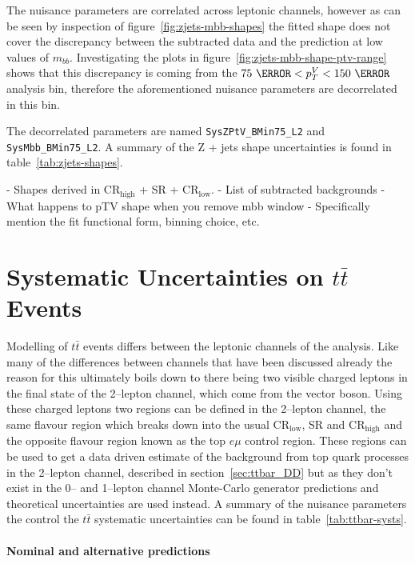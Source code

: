 The nuisance parameters are correlated across leptonic channels, however as can
be seen by inspection of figure~\ref{fig:zjets-mbb-shapes} the fitted shape does
not cover the discrepancy between the subtracted data and the prediction at low
values of $m_{bb}$. Investigating the plots in
figure~\ref{fig:zjets-mbb-shape-ptv-range} shows that this discrepancy is coming
from the $75~\GeV < p_T^V < 150~\GeV$ analysis bin, therefore the aforementioned
nuisance parameters are decorrelated in this bin.

The decorrelated parameters are named \texttt{SysZPtV\_BMin75\_L2} and
\texttt{SysMbb\_BMin75\_L2}. A summary of the Z + jets shape uncertainties is
found in table~\ref{tab:zjets-shapes}.


- Shapes derived in CR$_{\text{high}}$ + SR + CR$_{\text{low}}$.
- List of subtracted backgrounds
- What happens to pTV shape when you remove mbb window
- Specifically mention the fit functional form, binning choice, etc. 

\section{Systematic Uncertainties on \texorpdfstring{$t\bar{t}$}{tt} Events}
\label{sec:ttbar-systs}
Modelling of $t\bar{t}$ events differs between the leptonic channels of the
analysis. Like many of the differences between channels that have been discussed
already the reason for this ultimately boils down to there being two visible
charged leptons in the final state of the 2--lepton channel, which come from the
vector boson. Using these charged leptons two regions can be defined in the
2--lepton channel, the same flavour region which breaks down into the usual
CR$_{\text{low}}$, SR and CR$_{\text{high}}$ and the opposite flavour region
known as the top $e\mu$ control region. These regions can be used to get a data
driven estimate of the background from top quark processes in the 2--lepton
channel, described in section~\ref{sec:ttbar_DD} but as they don't exist in the
0-- and 1--lepton channel Monte-Carlo generator predictions and theoretical
uncertainties are used instead. A summary of the nuisance parameters the control
the $t\bar{t}$ systematic uncertainties can be found in
table~\ref{tab:ttbar-systs}.


\paragraph{Nominal and alternative predictions}

